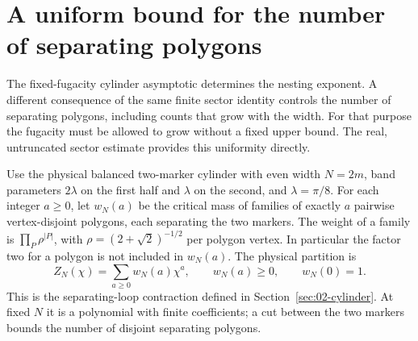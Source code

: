 \section{A uniform bound for the number of separating polygons}
\label{sec:06-all-count}

The fixed-fugacity cylinder asymptotic determines the nesting exponent.
A different consequence of the same finite sector identity controls the
number of separating polygons, including counts that grow with the
width. For that purpose the fugacity must be allowed to grow without a
fixed upper bound. The real, untruncated sector estimate provides this
uniformity directly.

Use the physical balanced two-marker cylinder with even width
\(N=2m\), band parameters \(2\lambda\) on the first half and
\(\lambda\) on the second, and \(\lambda=\pi/8\). For each integer
\(a\ge0\), let \(w_N(a)\) be the critical mass of families of exactly
\(a\) pairwise vertex-disjoint polygons, each separating the two
markers. The weight of a family is \(\prod_P\rho^{|P|}\), with
\(\rho=(2+\sqrt2)^{-1/2}\) per polygon vertex. In particular the
factor two for a polygon is not included in \(w_N(a)\). The physical
partition is
\begin{equation}
 Z_N(\chi)=\sum_{a\ge0}w_N(a)\chi^a,
 \qquad w_N(a)\ge0,
 \qquad w_N(0)=1.
 \label{eq:06-positive-coefficients}
\end{equation}
This is the separating-loop contraction defined in
Section~\ref{sec:02-cylinder}. At fixed \(N\) it is a polynomial with
finite coefficients; a cut between the two markers bounds the number
of disjoint separating polygons.

